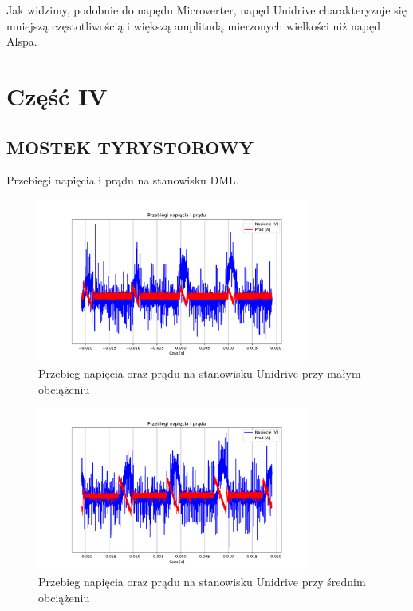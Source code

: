 \documentclass[11pt]{article}
\begin{document}
Jak widzimy, podobnie do napędu Microverter, napęd Unidrive charakteryzuje się mniejszą częstotliwością i większą amplitudą mierzonych wielkości niż napęd Alspa.\\

\section{Część IV}

\subsection{MOSTEK TYRYSTOROWY}

Przebiegi napięcia i prądu na stanowisku DML.\\

\begin{figure}[H]
\centering
\includegraphics[width=0.8\textwidth]{aun1_dml_obciazenie_weak.pdf}
\caption{Przebieg napięcia oraz prądu na stanowisku Unidrive przy małym obciążeniu}
\end{figure}

\begin{figure}[H]
\centering
\includegraphics[width=0.8\textwidth]{aun1_dml_obciazenie_medium.pdf}
\caption{Przebieg napięcia oraz prądu na stanowisku Unidrive przy średnim obciążeniu}
\end{figure}
\end{document}
